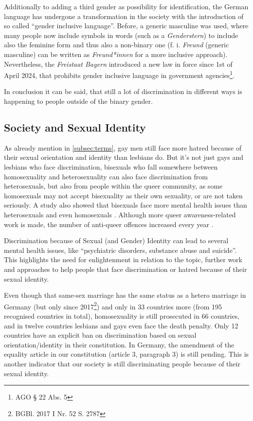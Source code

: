 Additionally to adding a third gender as possibility for identification, the German language has undergone a transformation in the society with the introduction of so called \enquote{gender inclusive language}. Before, a generic masculine was used, where many people now include symbols in words (such as a \textit{Genderstern}) to include also the feminine form and thus also a non-binary one (f. i. \textit{Freund} (generic masculine) can be written as \textit{Freund*innen} for a more inclusive approach). Nevertheless, the \textit{Freistaat Bayern} introduced a new law in force since 1st of April 2024, that prohibits gender inclusive language in government agencies\footnote{AGO § 22 Abs. 5}. 

In conclusion it can be said, that still a lot of discrimination in different ways is happening to people outside of the binary gender. 


\subsection{Society and Sexual Identity}

As already mention in \autoref{subsec:terms}, gay men still face more hatred because of their sexual orientation and identity than lesbians do.
But it's not just gays and lesbians who face discrimination, bisexuals who fall somewhere between homosexuality and heterosexuality can also face discrimination from heterosexuals, but also from people within the queer community, as some homosexuals may not accept bisexuality as their own sexuality, or are not taken seriously. A study also showed that bisexuals face more mental health issues than heterosexuals and even homosexuals \citep{bisexual-health}.  
Although more queer awareness-related work is made, the number of anti-queer offences increased every year \citep{queer-violence}. 

Discrimination because of Sexual (and Gender) Identity can lead to several mental health issues, like \enquote{psychiatric disorders, substance abuse and suicide}\citep{queer-mental}. This highlights the need for enlightenment in relation to the topic, further work and approaches to help people that face discrimination or hatred because of their sexual identity. 

Even though that same-sex marriage has the same status as a hetero marriage in Germany (but only since 2017\footnote{BGBl. 2017 I  Nr. 52 S. 2787}) and only in 33 countries more (from 195 recognised countries in total), homosexuality is still prosecuted in 66 countries, and in twelve countries lesbians and gays even face the death penalty. 
Only 12 countries have an explicit ban on discrimination based on sexual orientation/identity in their constitution. In Germany, the amendment of the equality article in our constitution (article 3, paragraph 3) is still pending. This is another indicator that our society is still discriminating people because of their sexual identity.


